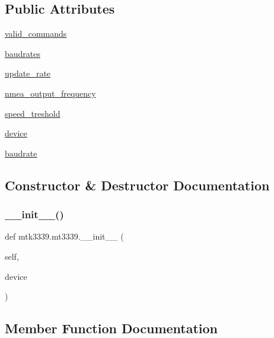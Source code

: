 \subsection*{Public Attributes}
\begin{DoxyCompactItemize}
\item 
\hyperlink{classmtk3339_1_1mt3339_a3f71eecf0bb228c3db098869c87d184f}{valid\+\_\+commands}
\item 
\hyperlink{classmtk3339_1_1mt3339_a563636737d8c2e4af0de628632351d23}{baudrates}
\item 
\hyperlink{classmtk3339_1_1mt3339_a3a9e6ffe9f3a8ae83316f3914d855494}{update\+\_\+rate}
\item 
\hyperlink{classmtk3339_1_1mt3339_a7cbf19382c7763eb4efa869c650c2019}{nmea\+\_\+output\+\_\+frequency}
\item 
\hyperlink{classmtk3339_1_1mt3339_a1a6b45aa285db140cd1b79d9cd6a324e}{speed\+\_\+treshold}
\item 
\hyperlink{classmtk3339_1_1mt3339_ad145a16c44025fed544f64875138fbeb}{device}
\item 
\hyperlink{classmtk3339_1_1mt3339_a9f084ef94ab48f0d86620b1ff6e149e1}{baudrate}
\end{DoxyCompactItemize}


\subsection{Constructor \& Destructor Documentation}
\mbox{\label{classmtk3339_1_1mt3339_a90c8bc08b1a156c6c19c26bdc77c7c02}} 
\subsubsection{\texorpdfstring{\+\_\+\+\_\+init\+\_\+\+\_\+()}{\_\_init\_\_()}}
{\footnotesize\ttfamily def mtk3339.\+mt3339.\+\_\+\+\_\+init\+\_\+\+\_\+ (\begin{DoxyParamCaption}\item[{}]{self,  }\item[{}]{device }\end{DoxyParamCaption})}



\subsection{Member Function Documentation}
\mbox{\label{classmtk3339_1_1mt3339_adee0951085b68b3359945a918f906d8c}} 
